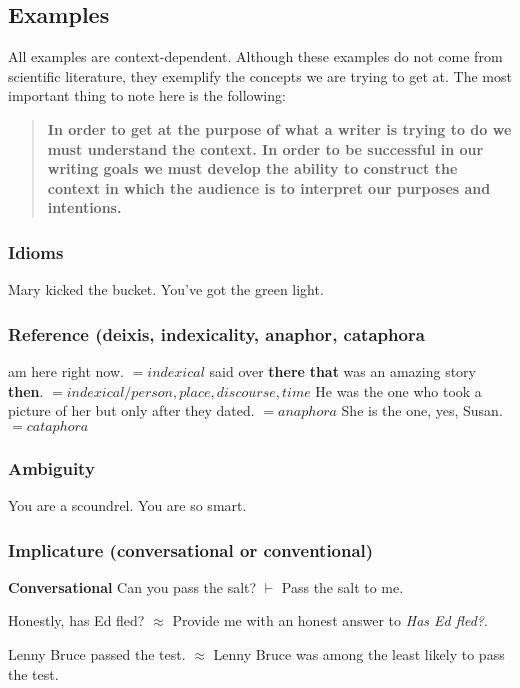 \documentclass{article}
\begin{document}
\subsection{Examples}
All examples are context-dependent. Although these examples do not come from scientific literature, they exemplify the concepts we are trying to get at. The most important thing to note here is the following:

\begin{quote}
\textbf{In order to get at the purpose of what a writer is trying to do we must understand the context. In order to be successful in our writing goals we must develop the ability to construct the context in which the audience is to interpret our purposes and intentions.}
\end{quote} 

\subsubsection{Idioms}
\pex \a Mary kicked the bucket.
\a You've got the green light.
\a 
\xe

\subsubsection{Reference (deixis, indexicality, anaphor, cataphora}
\pex {} am here right now. $= indexical$
 said over {\bf there} {\bf that} was an amazing story {\bf then}. $= indexical/person, place, discourse, time $
\a He was the one who took a picture of her but only after they dated. $= anaphora$
\a She is the one, yes, Susan. $= cataphora$
\xe

\subsubsection{Ambiguity}
\pex \a You are a scoundrel. 
\a You are so smart.
\xe

\subsubsection{Implicature (conversational or conventional)}
{\bf Conversational}
\pex \a Can you pass the salt?
\a $\vdash$ Pass the salt to me.
\xe

\pex \a Honestly, has Ed fled?
\a $\approx$ Provide me with an honest answer to {\sl Has Ed fled?}.
\xe

\pex {} Lenny Bruce passed the test.
\a $\approx$ Lenny Bruce was among the least likely to pass the test.
\xe
\end{document}
